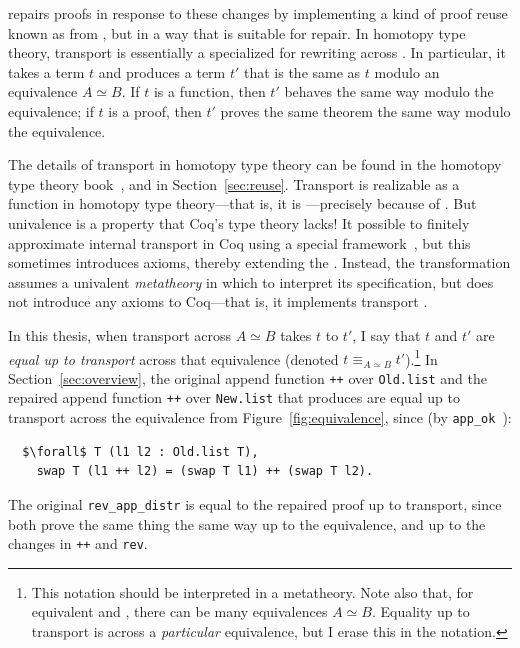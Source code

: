 \toolnamec repairs proofs in response to these changes by implementing a kind of proof reuse known as  from ,
but in a way that is suitable for repair.
In homotopy type theory, transport is essentially a specialized  for rewriting across .
In particular, it takes a term $t$ and produces a term $t'$ that is the same as $t$ modulo an equivalence $A \simeq B$.
If $t$ is a function, then $t'$ behaves the same way modulo the equivalence;
if $t$ is a proof, then $t'$ proves the same theorem the same way modulo the equivalence.

The details of transport in homotopy type theory can be found in the homotopy type theory book~\cite{univalent2013homotopy}, and in Section~\ref{sec:reuse}.
Transport is realizable as a function in homotopy type theory---that is, it is ---precisely because of .
But univalence is a property that Coq's type theory  lacks!
It  possible to finitely approximate internal transport in Coq using a special framework~\cite{tabareau2017equivalences},
but this sometimes introduces axioms, thereby extending the .
Instead, the \toolnamec transformation assumes a univalent \textit{metatheory} in which to interpret its specification,
but does not introduce any axioms to Coq---that is, it implements transport .

In this thesis, when transport across $A \simeq B$ takes $t$ to $t'$,
I say that $t$ and $t'$ are \textit{equal up to transport}
across that equivalence (denoted $t \equiv_{A \simeq B} t'$).\footnote{This notation should be interpreted in a  metatheory.
Note also that, for equivalent \Aa and \B, there can be many equivalences $A \simeq B$.
Equality up to transport is across a \textit{particular} equivalence, but I erase this in the 
notation.}
In Section~\ref{sec:overview}, the original append function \lstinline{++} over \lstinline{Old.list}
and the repaired append function \lstinline{++} over \lstinline{New.list} that \toolnamec produces are
equal up to transport across the equivalence from Figure~\ref{fig:equivalence}, since (by \lstinline{app_ok}~\href{https://github.com/uwplse/pumpkin-pi/blob/v2.0.0/plugin/coq/Swap.v}{}):

\begin{lstlisting}
  $\forall$ T (l1 l2 : Old.list T),
    swap T (l1 ++ l2) = (swap T l1) ++ (swap T l2).
\end{lstlisting}
The original \lstinline{rev_app_distr} is equal to the repaired proof up to transport,
since both prove the same thing the same way up to the equivalence, and up to the changes in \lstinline{++}
and \lstinline{rev}.

